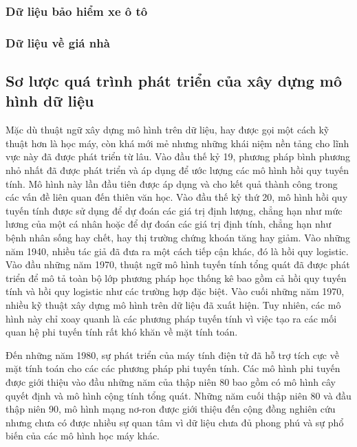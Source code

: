 \documentclass[
]{article}
\begin{document}
\hypertarget{dux1eef-liux1ec7u-bux1ea3o-hiux1ec3m-xe-uxf4-tuxf4}{%
\subsubsection{Dữ liệu bảo hiểm xe ô tô}\label{dux1eef-liux1ec7u-bux1ea3o-hiux1ec3m-xe-uxf4-tuxf4}}

\hypertarget{dux1eef-liux1ec7u-vux1ec1-giuxe1-nhuxe0}{%
\subsubsection{Dữ liệu về giá nhà}\label{dux1eef-liux1ec7u-vux1ec1-giuxe1-nhuxe0}}

\hypertarget{sux1a1-lux1b0ux1ee3c-quuxe1-truxecnh-phuxe1t-triux1ec3n-cux1ee7a-xuxe2y-dux1ef1ng-muxf4-huxecnh-dux1eef-liux1ec7u}{%
\subsection{Sơ lược quá trình phát triển của xây dựng mô hình dữ liệu}\label{sux1a1-lux1b0ux1ee3c-quuxe1-truxecnh-phuxe1t-triux1ec3n-cux1ee7a-xuxe2y-dux1ef1ng-muxf4-huxecnh-dux1eef-liux1ec7u}}

Mặc dù thuật ngữ xây dựng mô hình trên dữ liệu, hay được gọi một cách kỹ thuật hơn là học máy, còn khá mới mẻ nhưng những khái niệm nền tảng cho lĩnh vực này đã được phát triển từ lâu. Vào đầu thế kỷ 19, phương pháp bình phương nhỏ nhất đã được phát triển và áp dụng để ước lượng các mô hình hồi quy tuyến tính. Mô hình này lần đầu tiên được áp dụng và cho kết quả thành công trong các vấn đề liên quan đến thiên văn học. Vào đầu thế kỷ thứ 20, mô hình hồi quy tuyến tính được sử dụng để dự đoán các giá trị định lượng, chẳng hạn như mức lương của một cá nhân hoặc để dự đoán các giá trị định tính, chẳng hạn như bệnh nhân sống hay chết, hay thị trường chứng khoán tăng hay giảm. Vào những năm 1940, nhiều tác giả đã đưa ra một cách tiếp cận khác, đó là hồi quy logistic. Vào đầu những năm 1970, thuật ngữ mô hình tuyến tính tổng quát đã được phát triển để mô tả toàn bộ lớp phương pháp học thống kê bao gồm cả hồi quy tuyến tính và hồi quy logistic như các trường hợp đặc biệt. Vào cuối những năm 1970, nhiều kỹ thuật xây dựng mô hình trên dữ liệu đã xuất hiện. Tuy nhiên, các mô hình này chỉ xoay quanh là các phương pháp tuyến tính vì việc tạo ra các mối quan hệ phi tuyến tính rất khó khăn về mặt tính toán.

Đến những năm 1980, sự phát triển của máy tính điện tử đã hỗ trợ tích cực về mặt tính toán cho các các phương pháp phi tuyến tính. Các mô hình phi tuyến được giới thiệu vào đầu những năm của thập niên 80 bao gồm có mô hình cây quyết định và mô hình cộng tính tổng quát. Những năm cuối thập niên 80 và đầu thập niên 90, mô hình mạng nơ-ron được giới thiệu đến cộng đồng nghiên cứu nhưng chưa có được nhiều sự quan tâm vì dữ liệu chưa đủ phong phú và sự phổ biến của các mô hình học máy khác.
\end{document}
